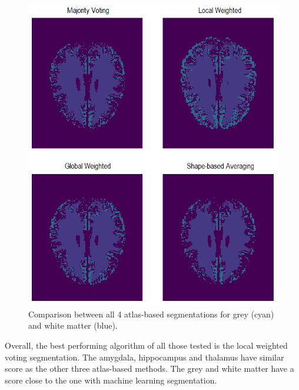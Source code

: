 \begin{figure}[h!]
	\centering
	\includegraphics[width=\linewidth]{img/compareSegmentationSlice}
	\caption{Comparison between all 4 atlas-based segmentations for grey (cyan) and white matter (blue).}
	\label{fig:compareSegmentationSlice}
\end{figure}

Overall, the best performing algorithm of all those tested is the local weighted voting segmentation. The amygdala, hippocampus and thalamus have similar score as the other three atlas-based methods. The grey and white matter have a score close to the one with machine learning segmentation.